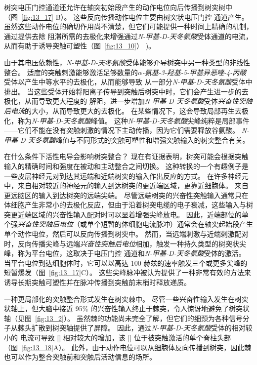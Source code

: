 树突电压门控通道还允许在轴突初始段产生的动作电位向后传播到树突树中（图~\ref{fig:13_17} B）。
这些反向传播动作电位主要由树突状电压门控  通道产生。
虽然这些动作电位的确切作用尚不清楚，但它们可能提供一种时间上精确的机制，通过提供去除  阻滞所需的去极化来增强通过\textit{N-甲基-D-天冬氨酸}受体通道的电流，从而有助于诱导突触可塑性（图~\ref{fig:13_10}） )。


由于其电压依赖性，\textit{N-甲基-D-天冬氨酸}受体能够介导树突中另一种类型的非线性整合。
适度的突触刺激能够激活足够数量的\textit{$\alpha$-氨基-3-羟基-5-甲基异恶唑-4-丙酸}受体以产生中等水平的去极化，从而能够导致  从一部分\textit{N-甲基-D-天冬氨酸}受体中排出。
当这些受体开始将阳离子传导到突触后树突中时，它们会产生进一步的去极化，从而导致更大程度的  解阻，进一步增加\textit{N-甲基-D-天冬氨酸}受体\textit{兴奋性突触后电流}的大小，从而导致更大的去极化。
在某些情况下，这会导致局部再生去极化，称为\textit{N-甲基-D-天冬氨酸}峰值。
这种\textit{N-甲基-D-天冬氨酸}尖峰纯粹是局部事件——它们不能在没有突触刺激的情况下主动传播，因为它们需要释放谷氨酸。
\textit{N-甲基-D-天冬氨酸}峰值与不同形式的突触可塑性和增强突触输入的树突整合有关。


在什么条件下活性电导会影响树突整合？
现在有证据表明，树突可能会根据突触输入的精确时间和强度在被动和主动整合之间切换。
这种转换的一个有趣例子是一些皮层神经元对到达其远端和近端树突的输入作出反应的方式。
在许多神经元中，来自相对较近的神经元的输入到达树突的更近端区域，更靠近细胞体。
来自更远脑区的输入到达树突的远端尖端。
尽管远端树突的兴奋性突触输入通常只在体细胞产生非常小的去极化反应，但由于沿着树突电缆的电子衰减，这些输入与树突更近端区域的兴奋性输入配对时可以显着增强尖峰放电。
因此，近端部位的单个强\textit{兴奋性突触后电位}（或单个短暂的体细胞电流脉冲）通常会在轴突起始段产生单个动作电位，然后可以反向传播到树突中。
然而，当远端刺激与近端刺激配对时，反向传播尖峰与远端\textit{兴奋性突触后电位}相加，触发一种持久类型的树突状尖峰，称为平台电位，这取决于电压门控  通道和\textit{N-甲基-D-天冬氨酸}受体的激活。
当平台电位到达细胞体时，它可以以高达 100 赫兹的速率触发三个或更多尖峰的短暂爆发（图~\ref{fig:13_17}C）。
这些尖峰脉冲被认为提供了一种非常有效的方法来诱导长期突触可塑性并在脉冲传播到突触前末梢时释放递质。


一种更局部化的突触整合形式发生在树突棘中。
尽管一些兴奋性输入发生在树突状轴上，但大脑中接近 95\% 的兴奋性输入终止于棘突，令人惊讶地避免了树突状轴（见图~\ref{fig:13_2}）。
虽然棘的功能尚未完全了解，但它们的细颈为各种信号分子从棘头扩散到树突轴提供了屏障。
因此，通过\textit{N-甲基-D-天冬氨酸}受体的相对较小的  电流可导致 [] 相对较大的增加，该 [] 位于被突触激活的单个脊柱头部（图~\ref{fig:13_18}A）。
此外，由于动作电位可以从细胞体反向传播到树突，因此棘也可以作为整合突触前和突触后活动信息的场所。


